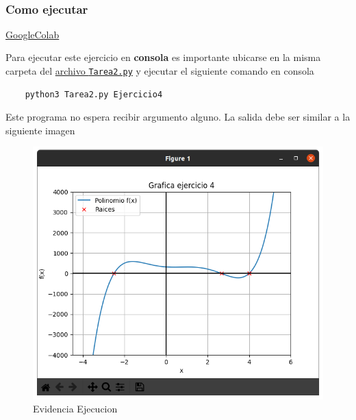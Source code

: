 \documentclass[11pt]{article}
\begin{document}
		\begin{center}
		\end{center}
		{ \hspace*{\fill} \\}		
		\hypertarget{como-ejecutar}{%
	\subsubsection{Como ejecutar}\label{como-ejecutar}}

		\href{https://colab.research.google.com/gist/BenchHPZ/.../---.ipynb}{GoogleColab}

	Para ejecutar este ejercicio en \textbf{consola} es importante ubicarse
	en la misma carpeta del
	\href{https://github.com/BenchHPZ/UG-Compu/blob/master/MN/Tareas/T2/Tarea2.py}{archivo
	\texttt{Tarea2.py}} y ejecutar el siguiente comando en consola

	\begin{verbatim}
	python3 Tarea2.py Ejercicio4
	\end{verbatim}

	Este programa no espera recibir argumento alguno. La salida debe ser
	similar a la siguiente imagen

	\begin{figure}
	\centering
	\includegraphics{assets/E4-1.png}
	\caption{Evidencia Ejecucion}
	\end{figure}
\end{document}
